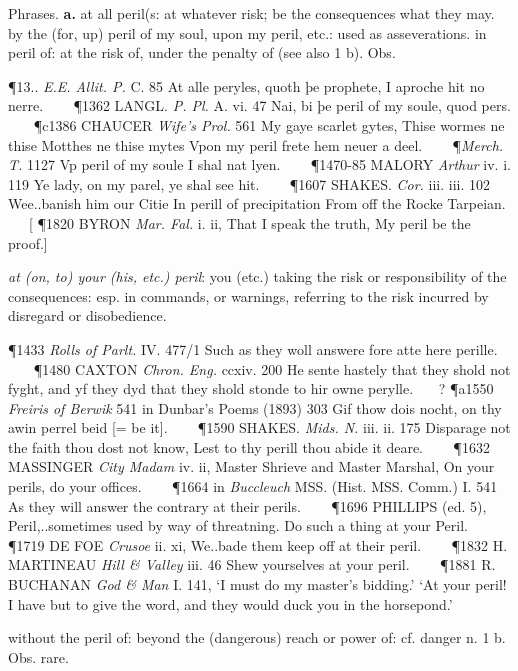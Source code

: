\begin{description}[wide, labelwidth=!, labelindent=0pt]
\begin{myenumerate}
 Phrases. \textbf{a.} at all peril(s: at whatever risk; be the consequences what they may. by the (for, up) peril of my soul, upon my peril, etc.: used as asseverations. in peril of: at the risk of, under the penalty of (see also 1 b). Obs.

\P 13..  \textit{E.E. Allit. P.} C. 85 At alle peryles, quoth þe prophete, I aproche hit no nerre.    
\P 1362 LANGL.  \textit{P. Pl.} A. vi. 47 Nai, bi þe peril of my soule, quod pers.    
\P c1386 CHAUCER  \textit{Wife's Prol.} 561 My gaye scarlet gytes, Thise wormes ne thise Motthes ne thise mytes Vpon my peril frete hem neuer a deel.     
\P \textit{Merch. T.} 1127 Vp peril  of my soule I shal nat lyen.    
\P 1470-85 MALORY  \textit{Arthur} iv. i. 119 Ye lady, on my parel, ye shal see hit.    
\P 1607 SHAKES.  \textit{Cor.} iii. iii. 102 Wee..banish him our Citie In perill of precipitation From off the Rocke Tarpeian.    [
\P 1820 BYRON  \textit{Mar. Fal.} i. ii, That I speak the truth, My peril be the proof.]

 \textit{at (on, to) your (his, etc.) peril}: you (etc.) taking the risk or responsibility of the consequences: esp. in commands, or warnings, referring to the risk incurred by disregard or disobedience.

\P 1433  \textit{Rolls of Parlt.} IV. 477/1 Such as they woll answere fore atte here perille.    
\P 1480 CAXTON  \textit{Chron. Eng.} ccxiv. 200 He sente hastely that they shold not fyght, and yf they dyd that they shold stonde to hir owne perylle.    ?
\P a1550 \textit{Freiris  of Berwik} 541 in Dunbar's Poems (1893) 303 Gif thow dois nocht, on thy awin perrel beid [= be it].    
\P 1590 SHAKES.  \textit{Mids. N.} iii. ii. 175 Disparage not the faith thou dost not know, Lest to thy perill thou abide it deare.    
\P 1632 MASSINGER  \textit{City Madam} iv. ii, Master Shrieve and Master Marshal, On your perils, do your offices.    
\P 1664 in  \textit{Buccleuch} MSS. (Hist. MSS. Comm.) I. 541 As they will answer the contrary at their perils.    
\P 1696 PHILLIPS  (ed. 5), Peril,..sometimes used by way of threatning. Do such a thing at your Peril.    
\P 1719 DE FOE  \textit{Crusoe} ii. xi, We..bade them keep off at their peril.    
\P 1832 H. MARTINEAU  \textit{Hill \& Valley} iii. 46 Shew yourselves at your peril.    
\P 1881 R. BUCHANAN  \textit{God \& Man} I. 141, ‘I must do my master's bidding.’ ‘At your peril! I have but to give the word, and they would duck you in the horsepond.’

 without the peril of: beyond the (dangerous) reach or power of: cf. danger n. 1 b. Obs. rare.


\end{myenumerate}
\end{description}
